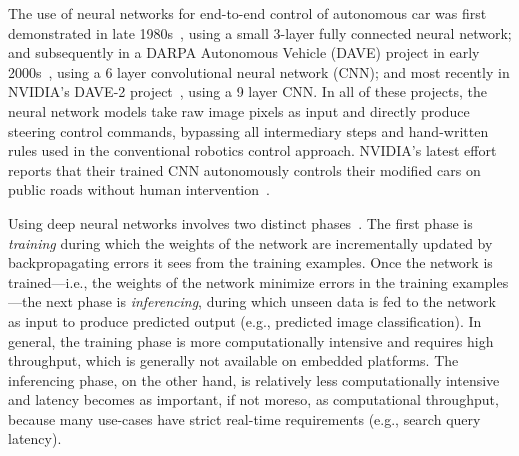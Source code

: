 The use of neural networks for end-to-end control of autonomous
car was first demonstrated in late 1980s~\cite{Pomerleau1989},
using a small 3-layer fully connected neural network; and subsequently
in a DARPA Autonomous Vehicle (DAVE) project in early
2000s~\cite{LeCun:04}, using a 6 layer convolutional neural network
(CNN); and most recently in NVIDIA's DAVE-2
project~\cite{Bojarski2016}, using a 9 layer CNN. In all of these projects,
the neural network models take raw image pixels as input and directly
produce steering control commands, bypassing all intermediary steps and
hand-written rules used in the conventional robotics control approach.  
NVIDIA's latest effort reports that their trained CNN
autonomously controls their modified cars on public roads without human
intervention~\cite{Bojarski2016}.

Using deep neural networks involves two distinct
phases~\cite{NVIDIA2015}. The first
phase is \emph{training} during which the weights of the network are
incrementally updated by backpropagating errors it sees from the
training examples. Once the network is trained---i.e., the weights of
the network minimize errors in the training examples---the next phase
is \emph{inferencing}, during which unseen data is fed to the network
as input to produce predicted output (e.g., predicted image
classification). In general, the training phase is more computationally
intensive and requires high throughput, which is generally not
available on embedded platforms. The inferencing phase, on the
other hand, is relatively less computationally intensive and latency becomes
as important, if not moreso, as computational throughput, because many
use-cases have strict real-time requirements (e.g., search query
latency).





